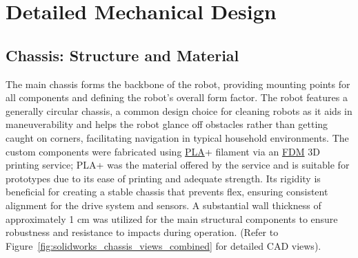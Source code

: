 \section{Detailed Mechanical Design}
\label{sec:detailed_mechanical_design}

\subsection{Chassis: Structure and Material}
\label{subsec:chassis_structure_material}
The main chassis forms the backbone of the robot, providing mounting points for all components and defining the robot's overall form factor.
The robot features a generally circular chassis, a common design choice for cleaning robots as it aids in maneuverability and helps the robot glance off obstacles rather than getting caught on corners, facilitating navigation in typical household environments.
The custom components were fabricated using \hyperref[term:pla]{PLA}+ filament via an \hyperref[term:fdm]{FDM} 3D printing service; PLA+ was the material offered by the service and is suitable for prototypes due to its ease of printing and adequate strength. Its rigidity is beneficial for creating a stable chassis that prevents flex, ensuring consistent alignment for the drive system and sensors. A substantial wall thickness of approximately 1 cm was utilized for the main structural components to ensure robustness and resistance to impacts during operation.
(Refer to Figure~\ref{fig:solidworks_chassis_views_combined} for detailed CAD views).


